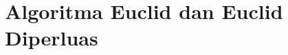 \documentclass[../buku_kriptografi.tex]{subfiles}
\begin{document}
\ifdefined\InMainDocument\else\setcounter{chapter}{2}\fi

\chapter{Algoritma Euclid dan Euclid Diperluas}





\ifdefined\InMainDocument\else


\fi
\end{document}
